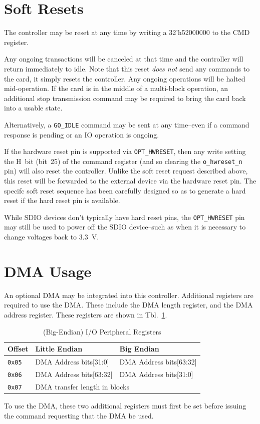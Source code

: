 \documentclass{gqtekspec}
\begin{document}
\section{Soft Resets}
The controller may be reset at any time by writing a 32'h52000000 to the
CMD register.

Any ongoing transactions will be canceled at that time and the controller will
return immediately to idle.  Note that this reset {\em does not} send any
commands to the card, it simply resets the controller.  Any ongoing operations
will be halted mid-operation.  If the card is in the middle of a multi-block
operation, an additional stop transmission command may be required to bring
the card back into a usable state.

Alternatively, a {\tt GO\_IDLE} command may be sent at any time--even if
a command response is pending or an IO operation is ongoing.

If the hardware reset pin is supported via {\tt OPT\_HWRESET}, then any write
setting the H~bit (bit~25) of the command register (and so clearing the
{\tt o\_hwreset\_n} pin) will also reset the controller.  Unlike the soft
reset request described above, this reset will be forwarded to the external
device via the hardware reset pin.  The specifc soft reset sequence has been
carefully designed so as to generate a hard reset if the hard reset pin
is available.

While SDIO devices don't typically have hard reset pins, the {\tt OPT\_HWRESET}
pin may still be used to power off the SDIO device--such as when it is
necessary to change voltages back to 3.3~V.
\section{DMA Usage}
An optional DMA may be integrated into this controller.  Additional registers
are required to use the DMA.  These include the DMA length register, and the
DMA address register.  These registers are shown in Tbl.~\ref{tbl:dma-regs}.
\begin{table}[htbp]
\begin{center}\begin{tabular}{|p{0.75in}|p{1.5in}|p{1.5in}|}\hline
\rowcolor[gray]{0.85} Offset & Little Endian & Big Endian \\\hline\hline
{\tt 0x05} & DMA Address bits[31:0] & DMA Address bits[63:32] \\\hline
{\tt 0x06} & DMA Address bits[63:32] & DMA Address bits[31:0] \\\hline
{\tt 0x07} & \multicolumn{2}{|l|}{DMA transfer length in blocks}\\\hline
\end{tabular}
\caption{(Big-Endian) I/O Peripheral Registers}\label{tbl:dma-regs}
\end{center}\end{table}
To use the DMA, these two additional registers must
first be set before issuing the command requesting that the DMA be used.
\end{document}

